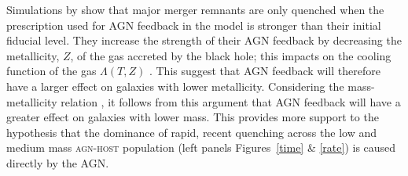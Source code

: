 
Simulations by \cite{sparre16} show that major merger remnants are only quenched when the prescription used for AGN feedback in the model is stronger than their initial fiducial level. They increase the strength of their AGN feedback by decreasing the metallicity, $Z$, of the gas accreted by the black hole; this impacts on the cooling function of the gas $\Lambda(T, Z)$ \citep[see Section 2.1 of][]{sparre16}. This suggest that AGN feedback will therefore have a larger effect on galaxies with lower metallicity. Considering the mass-metallicity relation \citep{tremonti04}, it follows from this argument that AGN feedback will have a greater effect on galaxies with lower mass. This provides more support to the hypothesis that the dominance of rapid, recent quenching across the low and medium mass \textsc{agn-host} population (left panels Figures~\ref{time} \& \ref{rate}) is caused directly by the AGN.


